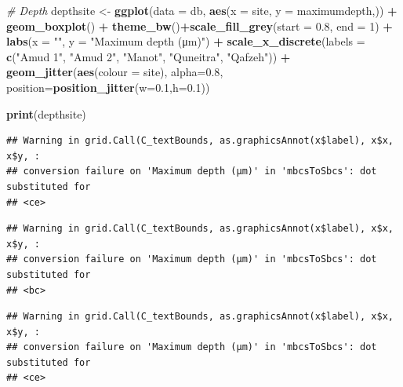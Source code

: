 \documentclass[
]{article}
\newenvironment{Shaded}{\begin{snugshade}}{\end{snugshade}}
\newcommand{\AttributeTok}[1]{\textcolor[rgb]{0.13,0.29,0.53}{#1}}
\newcommand{\CommentTok}[1]{\textcolor[rgb]{0.56,0.35,0.01}{\textit{#1}}}
\newcommand{\DecValTok}[1]{\textcolor[rgb]{0.00,0.00,0.81}{#1}}
\newcommand{\FloatTok}[1]{\textcolor[rgb]{0.00,0.00,0.81}{#1}}
\newcommand{\FunctionTok}[1]{\textcolor[rgb]{0.13,0.29,0.53}{\textbf{#1}}}
\newcommand{\NormalTok}[1]{#1}
\newcommand{\OtherTok}[1]{\textcolor[rgb]{0.56,0.35,0.01}{#1}}
\newcommand{\SpecialCharTok}[1]{\textcolor[rgb]{0.81,0.36,0.00}{\textbf{#1}}}
\newcommand{\StringTok}[1]{\textcolor[rgb]{0.31,0.60,0.02}{#1}}
\begin{document}
\begin{Shaded}
\begin{Highlighting}[]
\CommentTok{\# Depth}
\NormalTok{depthsite }\OtherTok{\textless{}{-}} \FunctionTok{ggplot}\NormalTok{(}\AttributeTok{data =}\NormalTok{ db, }\FunctionTok{aes}\NormalTok{(}\AttributeTok{x =}\NormalTok{ site, }\AttributeTok{y =}\NormalTok{ maximumdepth,)) }\SpecialCharTok{+}  
           \FunctionTok{geom\_boxplot}\NormalTok{() }\SpecialCharTok{+}
           \FunctionTok{theme\_bw}\NormalTok{()}\SpecialCharTok{+}\FunctionTok{scale\_fill\_grey}\NormalTok{(}\AttributeTok{start =} \FloatTok{0.8}\NormalTok{, }\AttributeTok{end =} \DecValTok{1}\NormalTok{) }\SpecialCharTok{+}
           \FunctionTok{labs}\NormalTok{(}\AttributeTok{x =} \StringTok{""}\NormalTok{, }\AttributeTok{y =} \StringTok{"Maximum depth (μm)"}\NormalTok{) }\SpecialCharTok{+}
           \FunctionTok{scale\_x\_discrete}\NormalTok{(}\AttributeTok{labels =} \FunctionTok{c}\NormalTok{(}\StringTok{"Amud 1"}\NormalTok{, }\StringTok{"Amud 2"}\NormalTok{, }\StringTok{"Manot"}\NormalTok{, }\StringTok{"Quneitra"}\NormalTok{, }\StringTok{"Qafzeh"}\NormalTok{)) }\SpecialCharTok{+}
           \FunctionTok{geom\_jitter}\NormalTok{(}\FunctionTok{aes}\NormalTok{(}\AttributeTok{colour =}\NormalTok{ site), }\AttributeTok{alpha=}\FloatTok{0.8}\NormalTok{, }\AttributeTok{position=}\FunctionTok{position\_jitter}\NormalTok{(}\AttributeTok{w=}\FloatTok{0.1}\NormalTok{,}\AttributeTok{h=}\FloatTok{0.1}\NormalTok{)) }

\FunctionTok{print}\NormalTok{(depthsite)}
\end{Highlighting}
\end{Shaded}

\begin{verbatim}
## Warning in grid.Call(C_textBounds, as.graphicsAnnot(x$label), x$x, x$y, :
## conversion failure on 'Maximum depth (μm)' in 'mbcsToSbcs': dot substituted for
## <ce>
\end{verbatim}

\begin{verbatim}
## Warning in grid.Call(C_textBounds, as.graphicsAnnot(x$label), x$x, x$y, :
## conversion failure on 'Maximum depth (μm)' in 'mbcsToSbcs': dot substituted for
## <bc>
\end{verbatim}

\begin{verbatim}
## Warning in grid.Call(C_textBounds, as.graphicsAnnot(x$label), x$x, x$y, :
## conversion failure on 'Maximum depth (μm)' in 'mbcsToSbcs': dot substituted for
## <ce>
\end{verbatim}
\end{document}
